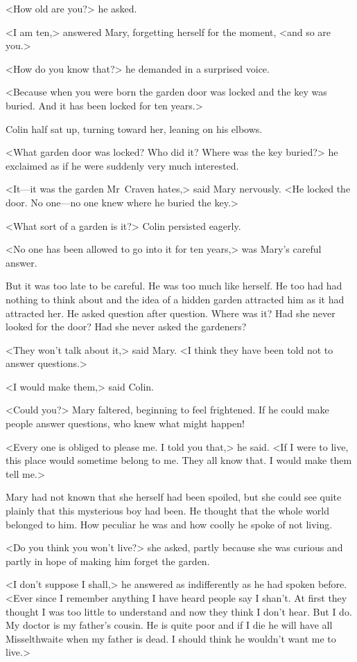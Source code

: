 <How old are you?> he asked.

<I am ten,> answered Mary, forgetting herself for the moment, <and so are you.>

<How do you know that?> he demanded in a surprised voice.

<Because when you were born the garden door was locked and the key was buried. And it has been locked for ten years.>

Colin half sat up, turning toward her, leaning on his elbows.

<What garden door was locked? Who did it? Where was the key buried?> he exclaimed as if he were suddenly very much interested.

<It—it was the garden Mr~Craven hates,> said Mary nervously. <He locked the door. No one—no one knew where he buried the key.>

<What sort of a garden is it?> Colin persisted eagerly.

<No one has been allowed to go into it for ten years,> was Mary's careful answer.

But it was too late to be careful. He was too much like herself. He too had had nothing to think about and the idea of a hidden garden attracted him as it had attracted her. He asked question after question. Where was it? Had she never looked for the door? Had she never asked the gardeners?

<They won't talk about it,> said Mary. <I think they have been told not to answer questions.>

<I would make them,> said Colin.

<Could you?> Mary faltered, beginning to feel frightened. If he could make people answer questions, who knew what might happen!

<Every one is obliged to please me. I told you that,> he said. <If I were to live, this place would sometime belong to me. They all know that. I would make them tell me.>

Mary had not known that she herself had been spoiled, but she could see quite plainly that this mysterious boy had been. He thought that the whole world belonged to him. How peculiar he was and how coolly he spoke of not living.

<Do you think you won't live?> she asked, partly because she was curious and partly in hope of making him forget the garden.

<I don't suppose I shall,> he answered as indifferently as he had spoken before. <Ever since I remember anything I have heard people say I shan't. At first they thought I was too little to understand and now they think I don't hear. But I do. My doctor is my father's cousin. He is quite poor and if I die he will have all Misselthwaite when my father is dead. I should think he wouldn't want me to live.>

